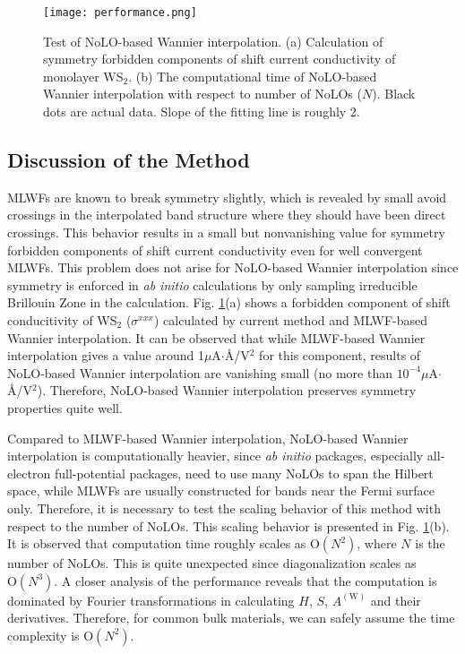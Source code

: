 \begin{figure}
	\texttt{[image: performance.png]}
	\caption{Test of NoLO-based Wannier interpolation. (a) Calculation of symmetry forbidden components of shift current conductivity of monolayer WS$_2$. (b) The computational time of NoLO-based Wannier interpolation with respect to number of NoLOs ($N$). Black dots are actual data. Slope of the fitting line is roughly 2.\label{fig:performance}}
\end{figure}

\subsection{Discussion of the Method}

MLWFs are known to break symmetry slightly, which is revealed by small avoid crossings in the interpolated band structure where they should have been direct crossings. This behavior results in a small but nonvanishing value for symmetry forbidden components of shift current conductivity even for well convergent MLWFs. This problem does not arise for NoLO-based Wannier interpolation since symmetry is enforced in \emph{ab initio} calculations by only sampling irreducible Brillouin Zone in the calculation. Fig. \ref{fig:performance}(a) shows a forbidden component of shift conducitivity of WS$_2$ ($\sigma^{xxx}$) calculated by current method and MLWF-based Wannier interpolation. It can be observed that while MLWF-based Wannier interpolation gives a value around 1$\mu$A$\cdot$\AA/V$^2$ for this component, results of NoLO-based Wannier interpolation are vanishing small (no more than $10^{-4}\mu$A$\cdot$\AA/V$^2$). Therefore, NoLO-based Wannier interpolation preserves symmetry properties quite well.

Compared to MLWF-based Wannier interpolation, NoLO-based Wannier interpolation is computationally heavier, since \emph{ab initio} packages, especially all-electron full-potential packages, need to use many NoLOs to span the Hilbert space, while MLWFs are usually constructed for bands near the Fermi surface only. Therefore, it is necessary to test the scaling behavior of this method with respect to the number of NoLOs. This scaling behavior is presented in Fig. \ref{fig:performance}(b). It is observed that computation time roughly scales as $\text{O}(N^2)$, where $N$ is the number of NoLOs. This is quite unexpected since diagonalization scales as $\text{O}(N^3)$. A closer analysis of the performance reveals that the computation is dominated by Fourier transformations in calculating $H$, $S$, $A^{(\text{W})}$ and their derivatives. Therefore, for common bulk materials, we can safely assume the time complexity is $\text{O}(N^2)$.

